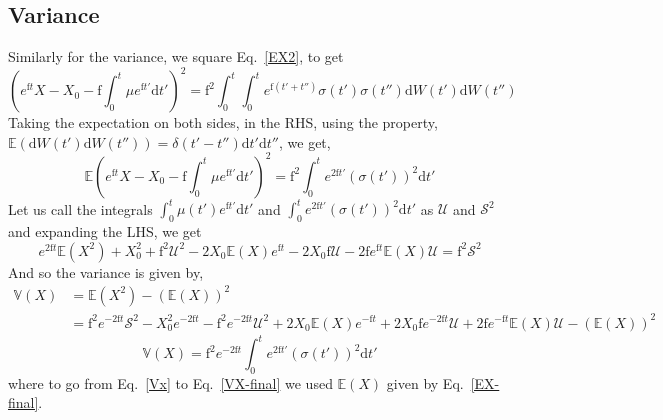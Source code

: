 \documentclass[12pt]{iopart}
\begin{document}
\subsection{Variance}
Similarly for the variance, we square Eq.~\eqref{EX2}, to get
\begin{equation}
\label{VX1}
\left(e^{\mathrm{f}t}X - X_0 - \mathrm{f}\int_0^t \mu e^{\mathrm{f}t'}\mathrm{d}t'\right)^2=\mathrm{f}^2\int_0^t\int_0^t e^{\mathrm{f}(t'+t'')}\sigma(t')\sigma(t'')\mathrm{d}W(t')\mathrm{d}W(t'')
\end{equation}
Taking the expectation on both sides, in the RHS, using the property, $\mathbb{E}(\mathrm{d}W(t')\mathrm{d}W(t'')) = \delta(t'-t'')\mathrm{d}t'\mathrm{d}t''$, we get,
\begin{equation}
\label{VX2}
\mathbb{E}\left(e^{\mathrm{f}t}X - X_0 - \mathrm{f}\int_0^t \mu e^{\mathrm{f}t'}\mathrm{d}t'\right)^2=\mathrm{f}^2\int_0^t e^{2\mathrm{f}t'}(\sigma(t'))^2\mathrm{d}t'
\end{equation}
Let us call the integrals $\int_0^t\mu(t') e^{\mathrm{f}t'}\mathrm{d}t'$ and $\int_0^t e^{2\mathrm{f}t'}(\sigma(t'))^2\mathrm{d}t'$ as $\mathcal{U}$ and $\mathcal{S}^2$ and expanding the LHS, we get
\begin{equation}
\label{VX3}
e^{2\mathrm{f}t}\mathbb{E}(X^2) + X_0^2 + \mathrm{f}^2 \mathcal{U}^2 - 2 X_0 \mathbb{E}(X) e^{\mathrm{f}t} - 2 X_0 \mathrm{f}\mathcal{U}-2\mathrm{f}e^{\mathrm{f}t}\mathbb{E}(X)\mathcal{U} = \mathrm{f}^2\mathcal{S}^2
\end{equation}
And so the variance is given by,
\begin{align}
\label{VX4}
\mathbb{V}(X) &= \mathbb{E}(X^2)-(\mathbb{E}(X))^2 \nonumber \\
&= \mathrm{f}^2 e^{-2\mathrm{f}t}\mathcal{S}^2 - X_0^2 e^{-2\mathrm{f}t} - \mathrm{f}^2 e^{-2\mathrm{f}t}\mathcal{U}^2 + 2 X_0 \mathbb{E}(X)e^{-\mathrm{f}t} +2 X_0 \mathrm{f}e^{-2\mathrm{f}t}\mathcal{U}+2\mathrm{f}e^{-\mathrm{f}t}\mathbb{E}(X)\mathcal{U} - (\mathbb{E}(X))^2
\end{align}
\begin{equation}
\label{VX-final}
\mathbb{V}(X) = \mathrm{f}^2 e^{-2\mathrm{f}t} \int_0^t e^{2\mathrm{f}t'}(\sigma(t'))^2\mathrm{d}t'
\end{equation}
where to go from Eq.~\eqref{Vx} to Eq.~\eqref{VX-final} we used $\mathbb{E}(X)$ given by Eq.~\eqref{EX-final}.
\end{document}
